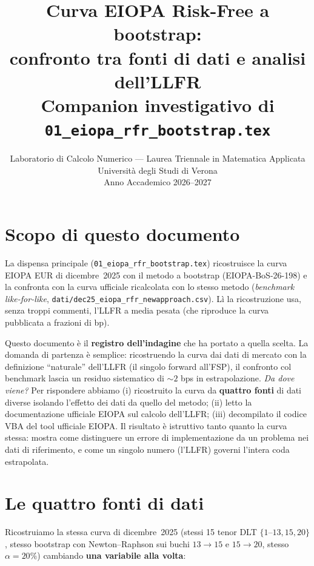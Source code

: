\documentclass[11pt,a4paper]{article}
\title{%
  \textbf{Curva EIOPA Risk-Free a bootstrap:\\[3pt]
  confronto tra fonti di dati e analisi dell'LLFR}\\[6pt]
  \large Companion investigativo di \texttt{01\_eiopa\_rfr\_bootstrap.tex}\\[4pt]
}
\author{Laboratorio di Calcolo Numerico --- Laurea Triennale in Matematica Applicata\\
  Universit\`a degli Studi di Verona\\[2pt]
  Anno Accademico 2026--2027}
\date{}
\theoremstyle{definition}
\theoremstyle{remark}
\begin{document}
\maketitle
\tableofcontents
\newpage

\section{Scopo di questo documento}
\label{sec:scopo}

La dispensa principale (\texttt{01\_eiopa\_rfr\_bootstrap.tex}) ricostruisce la curva EIOPA
EUR di dicembre~2025 con il metodo a bootstrap (EIOPA-BoS-26-198) e la confronta con la curva
ufficiale ricalcolata con lo stesso metodo (\emph{benchmark like-for-like},
\texttt{dati/dec25\_eiopa\_rfr\_newapproach.csv}). L\`i la ricostruzione usa, senza troppi
commenti, l'LLFR a media pesata (che riproduce la curva pubblicata a frazioni di bp).

Questo documento \`e il \textbf{registro dell'indagine} che ha portato a quella scelta. La
domanda di partenza \`e semplice: ricostruendo la curva dai dati di mercato con la
definizione ``naturale'' dell'LLFR (il singolo forward all'FSP), il confronto col benchmark
lascia un residuo sistematico di $\sim 2$ bps in estrapolazione. \emph{Da dove viene?} Per
rispondere abbiamo (i) ricostruito la curva da \textbf{quattro fonti} di dati diverse
isolando l'effetto dei dati da quello del metodo; (ii) letto la documentazione ufficiale
EIOPA sul calcolo dell'LLFR; (iii) decompilato il codice VBA del tool ufficiale EIOPA. Il
risultato \`e istruttivo tanto quanto la curva stessa: mostra come distinguere un errore di
implementazione da un problema nei dati di riferimento, e come un singolo numero (l'LLFR)
governi l'intera coda estrapolata.

\section{Le quattro fonti di dati}
\label{sec:fonti}

Ricostruiamo la stessa curva di dicembre~2025 (stessi 15 tenor DLT $\{1$--$13,15,20\}$, stesso
bootstrap con Newton--Raphson sui buchi $13\!\to\!15$ e $15\!\to\!20$, stesso $\alpha=20\%$)
cambiando \textbf{una variabile alla volta}:
\end{document}
